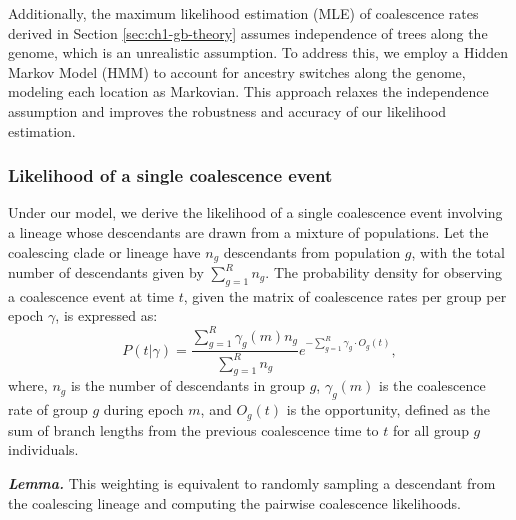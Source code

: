 Additionally, the maximum likelihood estimation (MLE) of coalescence rates derived in Section \ref{sec:ch1-gb-theory} assumes independence of trees along the genome, which is an unrealistic assumption. To address this, we employ a Hidden Markov Model (HMM) to account for ancestry switches along the genome, modeling each location as Markovian. This approach relaxes the independence assumption and improves the robustness and accuracy of our likelihood estimation.

\subsubsection{Likelihood of a single coalescence event}
\label{sec:gb_like_single_coal_event}
Under our model, we derive the likelihood of a single coalescence event involving a lineage whose descendants are drawn from a mixture of populations. Let the coalescing clade or lineage have $n_g$ descendants from population $g$, with the total number of descendants given by $\sum_{g=1}^R n_g$. The probability density for observing a coalescence event at time $t$, given the matrix of coalescence rates per group per epoch $\gamma$, is expressed as:
\begin{equation}
    P(t \vert \gamma) = \frac{\sum_{g=1}^R \gamma_g(m) n_g}{\sum_{g=1}^R n_g} 
    e^{-\sum_{g=1}^R \gamma_g \cdot O_g(t)},
\label{eq:gb_single_coal_like}
\end{equation}
where, $n_g$ is the number of descendants in group $g$, $\gamma_g(m)$ is the coalescence rate of group $g$ during epoch $m$, and $O_g(t)$ is the opportunity, defined as the sum of branch lengths from the previous coalescence time to $t$ for all group $g$ individuals. 

\noindent \textit{\textbf{Lemma.}} This weighting is equivalent to randomly sampling a descendant from the coalescing lineage and computing the pairwise coalescence likelihoods.

